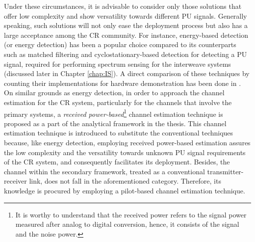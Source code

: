Under these circumstances, it is advisable to consider only those solutions that offer low complexity and show versatility towards different PU signals. Generally speaking, such solutions will not only ease the deployment process but also has a large acceptance among the CR community. For instance, energy-based detection (or energy detection) has been a popular choice compared to its counterparts such as matched filtering and cyclostationary-based detection for detecting a PU signal, required for performing spectrum sensing for the interweave systems (discussed later in Chapter \ref{chap:IS}). A direct comparison of these techniques by counting their implementations for hardware demonstration has been done in \cite{Pawe11}. On similar grounds as energy detection, in order to approach the channel estimation for the CR system, particularly for the channels that involve the primary systems, a \textit{received power-based}\footnote{It is worthy to understand that the received power refers to the signal power measured after analog to digital conversion, hence, it consists of the signal and the noise power.} channel estimation technique is proposed as a part of the analytical framework in the thesis. This channel estimation technique is introduced to substitute the conventional techniques because, like energy detection, employing received power-based estimation assures the low complexity and the versatility towards unknown PU signal requirements of the CR system, and consequently facilitates its deployment. Besides, the channel within the secondary framework, treated as a conventional transmitter-receiver link, does not fall in the aforementioned category. Therefore, its knowledge is procured by employing a pilot-based channel estimation technique.

